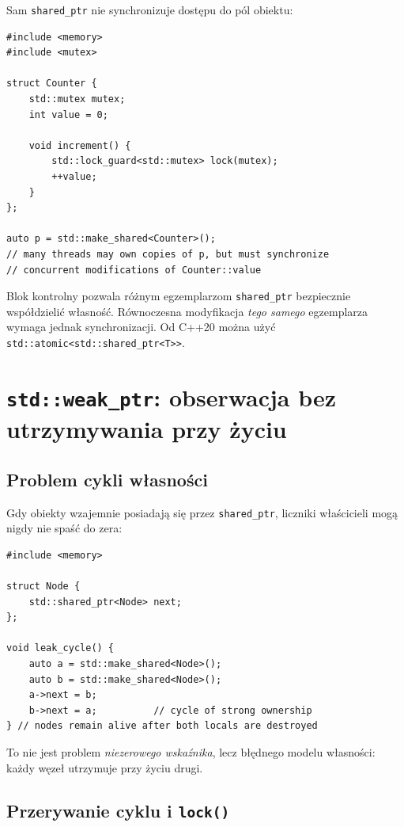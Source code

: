 Sam \texttt{shared\_ptr} nie synchronizuje dostępu do pól obiektu:

\begin{lstlisting}
#include <memory>
#include <mutex>

struct Counter {
    std::mutex mutex;
    int value = 0;

    void increment() {
        std::lock_guard<std::mutex> lock(mutex);
        ++value;
    }
};

auto p = std::make_shared<Counter>();
// many threads may own copies of p, but must synchronize
// concurrent modifications of Counter::value
\end{lstlisting}

Blok kontrolny pozwala różnym egzemplarzom \texttt{shared\_ptr}
bezpiecznie współdzielić własność. Równoczesna modyfikacja
\emph{tego samego} egzemplarza wymaga jednak synchronizacji.
Od C++20 można użyć \texttt{std::atomic<std::shared\_ptr<T>>}.

\section{\texttt{std::weak\_ptr}: obserwacja bez utrzymywania przy życiu}

\subsection{Problem cykli własności}

Gdy obiekty wzajemnie posiadają się przez \texttt{shared\_ptr},
liczniki właścicieli mogą nigdy nie spaść do zera:

\begin{lstlisting}
#include <memory>

struct Node {
    std::shared_ptr<Node> next;
};

void leak_cycle() {
    auto a = std::make_shared<Node>();
    auto b = std::make_shared<Node>();
    a->next = b;
    b->next = a;          // cycle of strong ownership
} // nodes remain alive after both locals are destroyed
\end{lstlisting}

To nie jest problem \emph{niezerowego wskaźnika}, lecz błędnego
modelu własności: każdy węzeł utrzymuje przy życiu drugi.

\subsection{Przerywanie cyklu i \texttt{lock()}}


